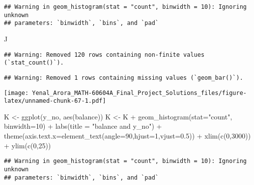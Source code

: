 \documentclass[
]{article}
\newenvironment{Shaded}{\begin{snugshade}}{\end{snugshade}}
\newcommand{\AttributeTok}[1]{\textcolor[rgb]{0.77,0.63,0.00}{#1}}
\newcommand{\DecValTok}[1]{\textcolor[rgb]{0.00,0.00,0.81}{#1}}
\newcommand{\FloatTok}[1]{\textcolor[rgb]{0.00,0.00,0.81}{#1}}
\newcommand{\FunctionTok}[1]{\textcolor[rgb]{0.00,0.00,0.00}{#1}}
\newcommand{\NormalTok}[1]{#1}
\newcommand{\OtherTok}[1]{\textcolor[rgb]{0.56,0.35,0.01}{#1}}
\newcommand{\SpecialCharTok}[1]{\textcolor[rgb]{0.00,0.00,0.00}{#1}}
\newcommand{\StringTok}[1]{\textcolor[rgb]{0.31,0.60,0.02}{#1}}
\begin{document}
\begin{verbatim}
## Warning in geom_histogram(stat = "count", binwidth = 10): Ignoring unknown
## parameters: `binwidth`, `bins`, and `pad`
\end{verbatim}

\begin{Shaded}
\begin{Highlighting}[]
\NormalTok{J}
\end{Highlighting}
\end{Shaded}

\begin{verbatim}
## Warning: Removed 120 rows containing non-finite values (`stat_count()`).
\end{verbatim}

\begin{verbatim}
## Warning: Removed 1 rows containing missing values (`geom_bar()`).
\end{verbatim}

\texttt{[image: Yenal\_Arora\_MATH-60604A\_Final\_Project\_Solutions\_files/figure-latex/unnamed-chunk-67-1.pdf]}

\begin{Shaded}
\begin{Highlighting}[]
\NormalTok{K }\OtherTok{\textless{}{-}} \FunctionTok{ggplot}\NormalTok{(y\_no, }\FunctionTok{aes}\NormalTok{(balance))}
\NormalTok{K }\OtherTok{\textless{}{-}}\NormalTok{ K }\SpecialCharTok{+} \FunctionTok{geom\_histogram}\NormalTok{(}\AttributeTok{stat=}\StringTok{"count"}\NormalTok{, }\AttributeTok{binwidth=}\DecValTok{10}\NormalTok{) }\SpecialCharTok{+} \FunctionTok{labs}\NormalTok{(}\AttributeTok{title =} \StringTok{"balance and y\_no"}\NormalTok{) }\SpecialCharTok{+}
  \FunctionTok{theme}\NormalTok{(}\AttributeTok{axis.text.x=}\FunctionTok{element\_text}\NormalTok{(}\AttributeTok{angle=}\DecValTok{90}\NormalTok{,}\AttributeTok{hjust=}\DecValTok{1}\NormalTok{,}\AttributeTok{vjust=}\FloatTok{0.5}\NormalTok{)) }\SpecialCharTok{+} 
  \FunctionTok{xlim}\NormalTok{(}\FunctionTok{c}\NormalTok{(}\DecValTok{0}\NormalTok{,}\DecValTok{3000}\NormalTok{)) }\SpecialCharTok{+} \FunctionTok{ylim}\NormalTok{(}\FunctionTok{c}\NormalTok{(}\DecValTok{0}\NormalTok{,}\DecValTok{25}\NormalTok{))}
\end{Highlighting}
\end{Shaded}

\begin{verbatim}
## Warning in geom_histogram(stat = "count", binwidth = 10): Ignoring unknown
## parameters: `binwidth`, `bins`, and `pad`
\end{verbatim}
\end{document}
